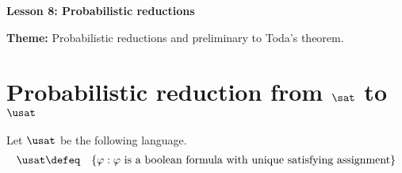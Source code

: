\documentclass[11pt, a4paper]{article}
\renewcommand{\lesson}{8}
\renewcommand{\lessontitle}{Probabilistic reductions}
\renewcommand{\fulltitle}{Lesson \lesson: \lessontitle}
\begin{document}
\date{}



\begin{center}
{\Large {\bf \fulltitle}}
\end{center}
\vspace{0.5cm}

\noindent
{\bf Theme:} Probabilistic reductions and preliminary to Toda's theorem.



\section{Probabilistic reduction from $\sat$ to $\usat$}

Let $\usat$ be the following language.
\begin{eqnarray*}
\usat & \defeq & \{\varphi: \varphi\ \text{is a boolean formula with unique satisfying assignment}\}
\end{eqnarray*}
\end{document}
